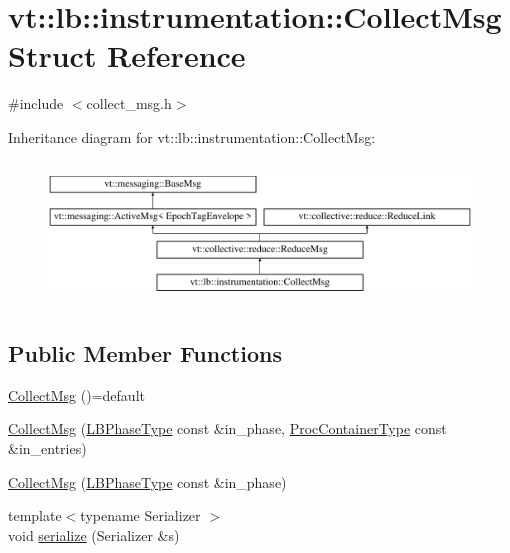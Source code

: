 \hypertarget{structvt_1_1lb_1_1instrumentation_1_1_collect_msg}{}\section{vt\+:\+:lb\+:\+:instrumentation\+:\+:Collect\+Msg Struct Reference}
\label{structvt_1_1lb_1_1instrumentation_1_1_collect_msg}


{\ttfamily \#include $<$collect\+\_\+msg.\+h$>$}

Inheritance diagram for vt\+:\+:lb\+:\+:instrumentation\+:\+:Collect\+Msg\+:\begin{figure}[H]
\begin{center}
\leavevmode
\includegraphics[height=3.796610cm]{structvt_1_1lb_1_1instrumentation_1_1_collect_msg}
\end{center}
\end{figure}
\subsection*{Public Member Functions}
\begin{DoxyCompactItemize}
\item 
\hyperlink{structvt_1_1lb_1_1instrumentation_1_1_collect_msg_a00aba7d5ef8b2e803775b13ace386e60}{Collect\+Msg} ()=default
\item 
\hyperlink{structvt_1_1lb_1_1instrumentation_1_1_collect_msg_a439937ef5646dc7d2b8be0dd68a9f2cf}{Collect\+Msg} (\hyperlink{namespacevt_a5505d0bab25ce2ff566a8e015871b379}{L\+B\+Phase\+Type} const \&in\+\_\+phase, \hyperlink{namespacevt_1_1lb_af7c6ee21a7b3966b7ab64c5b626d30f8}{Proc\+Container\+Type} const \&in\+\_\+entries)
\item 
\hyperlink{structvt_1_1lb_1_1instrumentation_1_1_collect_msg_ab7d73ed0bc6680b4c214aa2e44705d16}{Collect\+Msg} (\hyperlink{namespacevt_a5505d0bab25ce2ff566a8e015871b379}{L\+B\+Phase\+Type} const \&in\+\_\+phase)
\item 
{\footnotesize template$<$typename Serializer $>$ }\\void \hyperlink{structvt_1_1lb_1_1instrumentation_1_1_collect_msg_a0c499ea8b5dea147b7c1808400b2c77a}{serialize} (Serializer \&s)
\end{DoxyCompactItemize}
